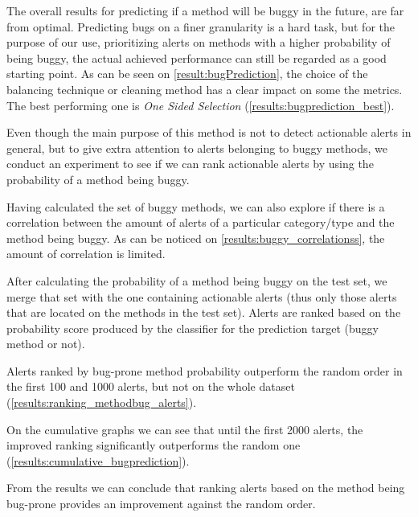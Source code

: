 The overall results for predicting if a method will be buggy in the future, are far from optimal. Predicting bugs on a finer granularity is a hard task, but for the purpose of our use, prioritizing alerts on methods with a higher probability of being buggy, the actual achieved performance can still be regarded as a good starting point.
As can be seen on \cref{result:bugPrediction}, the choice of the balancing technique or cleaning method has a clear impact on some the metrics. The best performing one is \textit{One Sided Selection} (\cref{results:bugprediction_best}). 

Even though the main purpose of this method is not to detect actionable alerts in general, but to give extra attention to alerts belonging to buggy methods, we conduct an experiment to see if we can rank actionable alerts by using the probability of a method being buggy.

Having calculated the set of buggy methods, we can also explore if there is a correlation between the amount of alerts of a particular category/type and the method being buggy. As can be noticed on \cref{results:buggy_correlationss}, the amount of correlation is limited. 

After calculating the probability of a method being buggy on the test set, we merge that set with the one containing actionable alerts (thus only those alerts that are located on the methods in the test set). Alerts are ranked based on the probability score produced by the classifier for the prediction target (buggy method or not). %

Alerts ranked by bug-prone method probability outperform the random order in the first 100 and 1000 alerts, but not on the whole dataset (\cref{results:ranking_methodbug_alerts}).

On the cumulative graphs we can see that until the first 2000 alerts, the improved ranking significantly outperforms the random one (\cref{results:cumulative_bugprediction}).

From the results we can conclude that ranking alerts based on the method being bug-prone provides an improvement against the random order. 

